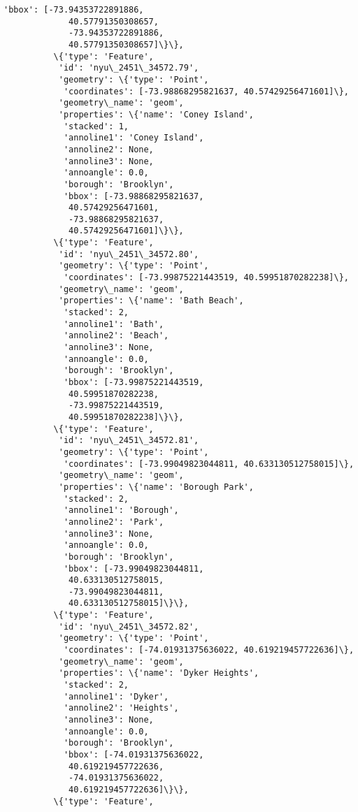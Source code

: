 \documentclass[11pt]{article}
\begin{document}
\begin{Verbatim}[commandchars=\\\{\}]
            'bbox': [-73.94353722891886,
             40.57791350308657,
             -73.94353722891886,
             40.57791350308657]\}\},
          \{'type': 'Feature',
           'id': 'nyu\_2451\_34572.79',
           'geometry': \{'type': 'Point',
            'coordinates': [-73.98868295821637, 40.57429256471601]\},
           'geometry\_name': 'geom',
           'properties': \{'name': 'Coney Island',
            'stacked': 1,
            'annoline1': 'Coney Island',
            'annoline2': None,
            'annoline3': None,
            'annoangle': 0.0,
            'borough': 'Brooklyn',
            'bbox': [-73.98868295821637,
             40.57429256471601,
             -73.98868295821637,
             40.57429256471601]\}\},
          \{'type': 'Feature',
           'id': 'nyu\_2451\_34572.80',
           'geometry': \{'type': 'Point',
            'coordinates': [-73.99875221443519, 40.59951870282238]\},
           'geometry\_name': 'geom',
           'properties': \{'name': 'Bath Beach',
            'stacked': 2,
            'annoline1': 'Bath',
            'annoline2': 'Beach',
            'annoline3': None,
            'annoangle': 0.0,
            'borough': 'Brooklyn',
            'bbox': [-73.99875221443519,
             40.59951870282238,
             -73.99875221443519,
             40.59951870282238]\}\},
          \{'type': 'Feature',
           'id': 'nyu\_2451\_34572.81',
           'geometry': \{'type': 'Point',
            'coordinates': [-73.99049823044811, 40.633130512758015]\},
           'geometry\_name': 'geom',
           'properties': \{'name': 'Borough Park',
            'stacked': 2,
            'annoline1': 'Borough',
            'annoline2': 'Park',
            'annoline3': None,
            'annoangle': 0.0,
            'borough': 'Brooklyn',
            'bbox': [-73.99049823044811,
             40.633130512758015,
             -73.99049823044811,
             40.633130512758015]\}\},
          \{'type': 'Feature',
           'id': 'nyu\_2451\_34572.82',
           'geometry': \{'type': 'Point',
            'coordinates': [-74.01931375636022, 40.619219457722636]\},
           'geometry\_name': 'geom',
           'properties': \{'name': 'Dyker Heights',
            'stacked': 2,
            'annoline1': 'Dyker',
            'annoline2': 'Heights',
            'annoline3': None,
            'annoangle': 0.0,
            'borough': 'Brooklyn',
            'bbox': [-74.01931375636022,
             40.619219457722636,
             -74.01931375636022,
             40.619219457722636]\}\},
          \{'type': 'Feature',

\end{Verbatim}
\end{document}
